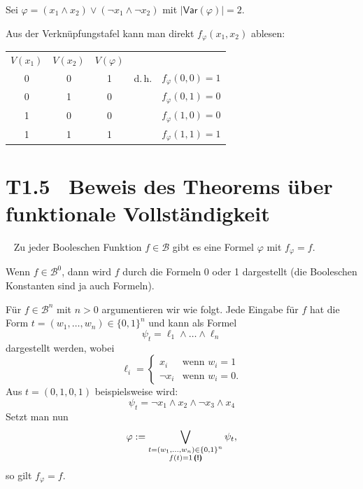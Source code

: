 \documentclass[fontsize=11pt, twoside=false, numbers=autoenddot]{scrbook}
\begin{document}
Sei $\varphi = (x_1 \land x_2) \lor (\lnot x_1 \land \lnot x_2)$ mit $|\textsf{Var}(\varphi)|=2$.

Aus der Verknüpfungstafel kann man direkt $f_\varphi(x_1,x_2)$ ablesen:

\begin{center}
  \begin{tabular}{cc|ccl}
    $V(x_1)$ & $V(x_2)$ & $V(\varphi)$ &        &                      \\\cline{1-3}
    0        & 0        & 1            & d.\,h. & $f_\varphi(0,0) = 1$ \\
    0        & 1        & 0            &        & $f_\varphi(0,1) = 0$ \\
    1        & 0        & 0            &        & $f_\varphi(1,0) = 0$ \\
    1        & 1        & 1            &        & $f_\varphi(1,1) = 1$
  \end{tabular}
\end{center}

\section*{T1.5~ Beweis des Theorems über funktionale Vollständigkeit}

~
Zu jeder Booleschen Funktion $f \in \mathcal{B}$ gibt es eine Formel $\varphi$ mit $f_\varphi=f$.

\par\medskip\noindent
\begin{beweis}
  Wenn $f \in \mathcal{B}^0$, dann wird $f$ durch die Formeln 0 oder 1 dargestellt
  (die Booleschen Konstanten sind ja auch Formeln).

  Für $f \in \mathcal{B}^n$ mit $n > 0$ argumentieren wir wie folgt.
  Jede Eingabe für $f$ hat die Form $t = (w_1,\dots,w_n) \in \{0,1\}^n$
  und kann als Formel
  \[
    \psi_t = \ell_1 \land \dots \land \ell_n
  \]
  dargestellt werden, wobei
  \[
    \ell_i = \begin{cases}
               x_i       & \text{wenn~} w_i = 1 \\
               \lnot x_i & \text{wenn~} w_i = 0.
             \end{cases}
  \]
  Aus $t = (0,1,0,1)$ beispielsweise wird:
  \[
    \psi_t = \lnot x_1 \land x_2 \land \lnot x_3 \land x_4
  \]
  Setzt man nun
  \[
    \varphi := \bigvee_{\substack{t = (w_1,\dots,w_n) \in \{0,1\}^n \\ f(t) = 1\,\textbf{\textsf{(!)}}}} \psi_t,
  \]
  so gilt $f_\varphi = f$.\qedhere
\end{beweis}
\end{document}
